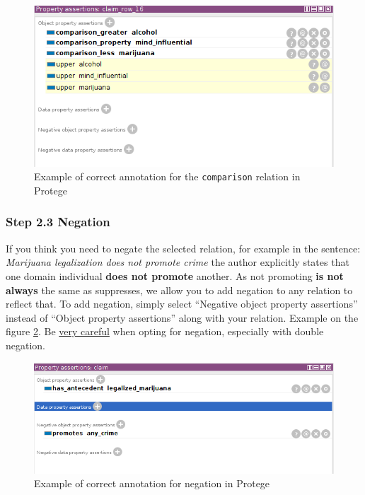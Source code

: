 \begin{figure}
	\includegraphics[scale=0.7]{comparison.png}
	\caption{Example of correct annotation for the \texttt{comparison} relation in Protege}
	\label{fig:comparison_example}
\end{figure}

\subsubsection*{Step 2.3 Negation}

If you think you need to negate the selected relation, for example in the
sentence: \textit{Marijuana legalization does not promote crime} the author explicitly
states that one domain individual \textbf{does not promote} another. As not promoting \textbf{is
not always} the same as suppresses, we allow you to add negation to any
relation to reflect that. To add negation, simply select ``Negative object
property assertions'' instead of ``Object property assertions'' along with your
relation. Example on the figure \ref{fig:negation_example}. Be \underline{very careful}
when opting for negation, especially with double negation.

\begin{figure}
	\includegraphics[scale=0.7]{negation.png}
	\caption{Example of correct annotation for negation in Protege}
	\label{fig:negation_example}
\end{figure}

